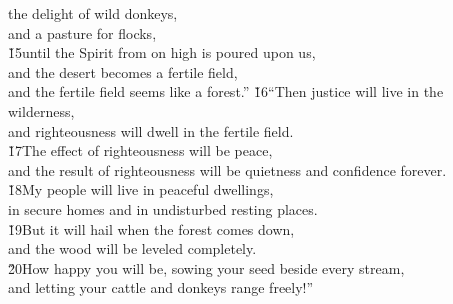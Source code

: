 \begin{poetry}
\poeml the delight of wild donkeys, \\
\poemll    and a pasture for flocks, \\
\poeml \v{15}until the Spirit from on high is poured upon us, \\
\poemll    and the desert becomes a fertile field, \\
\poemlll       and the fertile field seems like a forest.''
\poeml \v{16}``Then justice will live in the wilderness, \\
\poemll    and righteousness will dwell in the fertile field. \\
\poeml \v{17}The effect of righteousness will be peace, \\
\poemll    and the result of righteousness will be quietness and confidence forever. \\
\poeml \v{18}My people will live in peaceful dwellings, \\
\poemll    in secure homes and in undisturbed resting places. \\
\poeml \v{19}But it will hail when the forest comes down, \\
\poemll    and the wood will be leveled completely. \\
\poeml \v{20}How happy you will be, sowing your seed beside every stream, \\
\poemll    and letting your cattle and donkeys range freely!''
\end{poetry}

